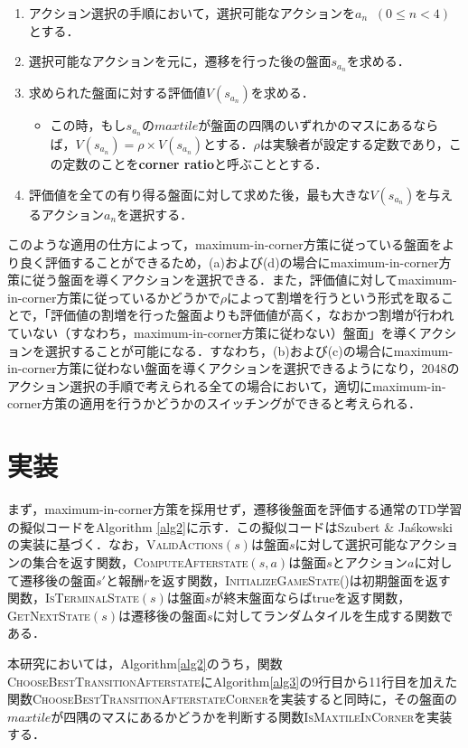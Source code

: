 \documentclass{suribt}
\begin{document}
\begin{enumerate}
\item アクション選択の手順において，選択可能なアクションを$a_n \;\; (0 \leq n < 4)$とする．
\item 選択可能なアクションを元に，遷移を行った後の盤面$s_{a_n}$を求める．
\item 求められた盤面に対する評価値$V(s_{a_n})$を求める．
\begin{itemize}
\item この時，もし$s_{a_n}$の$maxtile$が盤面の四隅のいずれかのマスにあるならば，$V(s_{a_n}) = {\rho} \times V(s_{a_n})$とする．${\rho}$は実験者が設定する定数であり，この定数のことを\textbf{corner ratio}と呼ぶこととする．
\end{itemize}
\item 評価値を全ての有り得る盤面に対して求めた後，最も大きな$V(s_{a_n})$を与えるアクション$a_n$を選択する．
\end{enumerate}

このような適用の仕方によって，maximum-in-corner方策に従っている盤面をより良く評価することができるため，(a)および(d)の場合にmaximum-in-corner方策に従う盤面を導くアクションを選択できる．また，評価値に対してmaximum-in-corner方策に従っているかどうかで${\rho}$によって割増を行うという形式を取ることで，「評価値の割増を行った盤面よりも評価値が高く，なおかつ割増が行われていない（すなわち，maximum-in-corner方策に従わない）盤面」を導くアクションを選択することが可能になる．すなわち，(b)および(c)の場合にmaximum-in-corner方策に従わない盤面を導くアクションを選択できるようになり，2048のアクション選択の手順で考えられる全ての場合において，適切にmaximum-in-corner方策の適用を行うかどうかのスイッチングができると考えられる．

\section{実装}
まず，maximum-in-corner方策を採用せず，遷移後盤面を評価する通常のTD学習の擬似コードをAlgorithm \ref{alg2}に示す．この擬似コードはSzubert \& Ja\'{s}kowskiの実装に基づく．なお，\textsc{ValidActions}$(s)$は盤面$s$に対して選択可能なアクションの集合を返す関数，\textsc{ComputeAfterstate}$(s,a)$は盤面$s$とアクション$a$に対して遷移後の盤面$s'$と報酬$r$を返す関数，\textsc{InitializeGameState()}は初期盤面を返す関数，\textsc{IsTerminalState}$(s)$は盤面$s$が終末盤面ならばtrueを返す関数，\textsc{GetNextState}$(s)$は遷移後の盤面$s$に対してランダムタイルを生成する関数である．

本研究においては，Algorithm\ref{alg2}のうち，関数\textsc{ChooseBestTransitionAfterstate}にAlgorithm\ref{alg3}の9行目から11行目を加えた関数\textsc{ChooseBestTransitionAfterstateCorner}を実装すると同時に，その盤面の$maxtile$が四隅のマスにあるかどうかを判断する関数\textsc{IsMaxtileInCorner}を実装する．
\end{document}
